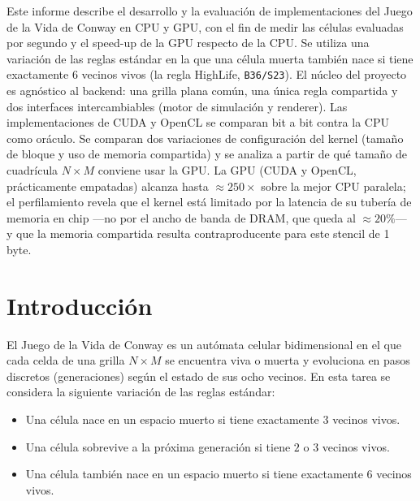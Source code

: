 \documentclass[
	spanish,
	letterpaper, oneside
]{article}
\begin{document}
\templatePortrait

\templatePagecfg

\begin{abstractd}
	Este informe describe el desarrollo y la evaluación de implementaciones del
	Juego de la Vida de Conway en CPU y GPU, con el fin de
	medir las células evaluadas por segundo y el speed-up de la GPU respecto
	de la CPU. Se utiliza una variación de las reglas estándar en la que una célula
	muerta también nace si tiene exactamente $6$ vecinos vivos (la regla
	HighLife, \texttt{B36/S23}). El núcleo del proyecto es agnóstico al
	backend: una grilla plana común, una única regla compartida y dos interfaces
	intercambiables (motor de simulación y renderer). Las implementaciones de CUDA y OpenCL se comparan
	bit a bit contra la CPU como oráculo. Se comparan dos variaciones de
	configuración del kernel (tamaño de bloque y uso de memoria compartida) y se
	analiza a partir de qué tamaño de cuadrícula $N \times M$ conviene usar la GPU. La
	GPU (CUDA y OpenCL, prácticamente empatadas) alcanza hasta $\approx 250\times$ sobre la mejor CPU paralela; el perfilamiento
	revela que el kernel está limitado por la latencia de su tubería de memoria en chip
	---no por el ancho de banda de DRAM, que queda al $\approx20\%$--- y que la memoria
	compartida resulta contraproducente para este stencil de 1 byte.
\end{abstractd}

\templateIndex

\templateFinalcfg


\section{Introducción}
\label{sec:introduccion}

El Juego de la Vida de Conway es un autómata celular bidimensional en el que cada
celda de una grilla $N \times M$ se encuentra viva o muerta y evoluciona en pasos
discretos (generaciones) según el estado de sus ocho vecinos. En esta tarea se
considera la siguiente variación de las reglas estándar:

\begin{itemize}
	\item Una célula nace en un espacio muerto si tiene exactamente $3$ vecinos vivos.
	\item Una célula sobrevive a la próxima generación si tiene $2$ o $3$ vecinos vivos.
	\item Una célula también nace en un espacio muerto si tiene exactamente $6$ vecinos vivos.
\end{itemize}
\end{document}
